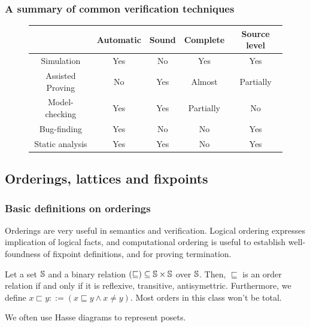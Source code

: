 \documentclass[toc, titlepaged]{../cs-classes/cs-classes}
\begin{document}
\subsubsection{A summary of common verification techniques}
\begin{figure}[!ht]
    \centering
    \begin{tabular}{|c||c|c|c|c|}
        \hline
        &Automatic&Sound&Complete&Source level\\
        \hline
        \hline
        Simulation&Yes&No&Yes&Yes\\
        \hline
        Assisted Proving&No&Yes&Almost&Partially\\
        \hline
        Model-checking&Yes&Yes&Partially&No\\
        \hline
        Bug-finding&Yes&No&No&Yes\\
        \hline
        Static analysis&Yes&Yes&No&Yes\\
        \hline
    \end{tabular}
\end{figure}

\subsection{Orderings, lattices and fixpoints}
\subsubsection{Basic definitions on orderings}
Orderings are very useful in semantics and verification. Logical ordering expresses implication of logical facts, and computational ordering is useful to establish well-foundness of fixpoint definitions, and for proving termination.

\begin{definition}
    Let a set $\S$ and a binary relation $(\sqsubseteq)\subseteq\S\times\S$ over $\S$. Then, $\sqsubseteq$ is an order relation if and only if it is reflexive, transitive, antisymettric. Furthermore, we define $x\sqsubset y::=(x\sqsubseteq y \land x\neq y)$. Most orders in this class won't be total.
\end{definition}

We often use Hasse diagrams to represent posets.
\end{document}
